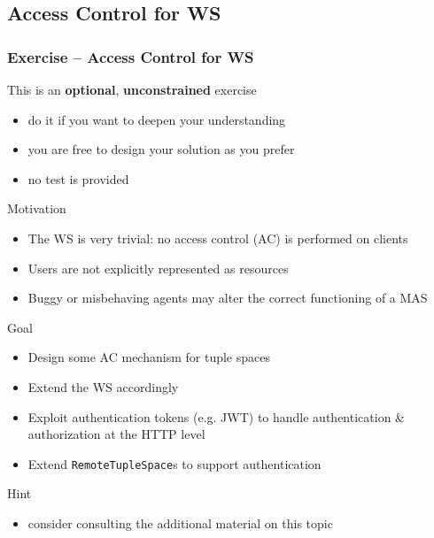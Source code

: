 \documentclass[presentation]{beamer}\mode<presentation>{\usetheme{AMSCesenaPurpleAndGold}}
\begin{document}
\startExercise

\subsection{Access Control for \linda{} WS}

\begin{frame}[allowframebreaks]
\frametitle{Exercise \currentExercise{} -- Access Control for \linda{} WS}
	\begin{alertblock}{This is an \textbf{optional}, \textbf{unconstrained} exercise}
		\begin{itemize}
			\item do it if you want to deepen your understanding
			\item you are free to design your solution as you prefer
			\item no test is provided
		\end{itemize}
	\end{alertblock}

	\begin{block}{Motivation}
		\begin{itemize}
			\item The \linda{} WS is very trivial: no \alert{access control} (AC) is performed on clients
			\item Users are not explicitly represented as resources
			\item Buggy or misbehaving agents may alter the correct functioning of a MAS 
		\end{itemize}
	\end{block}

	\begin{block}{Goal}
		\begin{itemize}
			\item Design some AC mechanism for \linda{} tuple spaces
			
			\item Extend the \linda{} WS accordingly

			\item Exploit authentication tokens (e.g. JWT) to handle authentication \& authorization at the HTTP level
			
			\item Extend \texttt{RemoteTupleSpace}s to support authentication
		\end{itemize}
	\end{block}

	\begin{exampleblock}{Hint}
		\begin{itemize}
			\item consider consulting the additional material on this topic
		\end{itemize}
	\end{exampleblock}
\end{frame}
\end{document}
